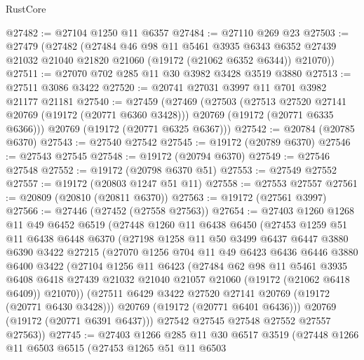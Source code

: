 \begin{lexlean}{RustCore}
\begin{coremodule}
@27482 := @27104 @1250 @11 @6357
@27484 := @27110 @269 @23
@27503 := @27479
    (@27482
      (@27484
        @46
        @98
        @11
        @5461
        @3935
        @6343
        @6352
        @27439
        @21032
        @21040
        @21820
        @21060
        (@19172 (@21062 @6352 @6344))
        @21070))
@27511 := @27070 @702 @285 @11 @30 @3982 @3428 @3519 @3880
@27513 := @27511 @3086 @3422
@27520 := @20741 @27031 @3997 @11 @701 @3982 @21177 @21181
@27540 := @27459
    (@27469
      (@27503
        (@27513 @27520 @27141 @20769 (@19172 (@20771 @6360 @3428)))
        @20769
        (@19172 (@20771 @6335 @6366)))
      @20769
      (@19172 (@20771 @6325 @6367)))
@27542 := @20784 (@20785 @6370)
@27543 := @27540 @27542
@27545 := @19172 (@20789 @6370)
@27546 := @27543 @27545
@27548 := @19172 (@20794 @6370)
@27549 := @27546 @27548
@27552 := @19172 (@20798 @6370 @51)
@27553 := @27549 @27552
@27557 := @19172 (@20803 @1247 @51 @11)
@27558 := @27553 @27557
@27561 := @20809 (@20810 (@20811 @6370))
@27563 := @19172 (@27561 @3997)
@27566 := @27446 (@27452 (@27558 @27563))
@27654 := @27403
    @1260
    @1268
    @11
    @49
    @6452
    @6519
    (@27448
      @1260
      @11
      @6438
      @6450
      (@27453
        @1259
        @51
        @11
        @6438
        @6448
        @6370
        (@27198
          @1258
          @11
          @50
          @3499
          @6437
          @6447
          @3880
          @6390
          @3422
          @27215
          (@27070
            @1256
            @704
            @11
            @49
            @6423
            @6436
            @6446
            @3880
            @6400
            @3422
            (@27104
              @1256
              @11
              @6423
              (@27484
                @62
                @98
                @11
                @5461
                @3935
                @6408
                @6418
                @27439
                @21032
                @21040
                @21057
                @21060
                (@19172 (@21062 @6418 @6409))
                @21070))
            (@27511 @6429 @3422 @27520 @27141 @20769 (@19172 (@20771 @6430 @3428)))
            @20769
            (@19172 (@20771 @6401 @6436)))
          @20769
          (@19172 (@20771 @6391 @6437)))
        @27542
        @27545
        @27548
        @27552
        @27557
        @27563))
@27745 := @27403
    @1266
    @285
    @11
    @30
    @6517
    @3519
    (@27448
      @1266
      @11
      @6503
      @6515
      (@27453
        @1265
        @51
        @11
        @6503

\end{coremodule}
\end{lexlean}
